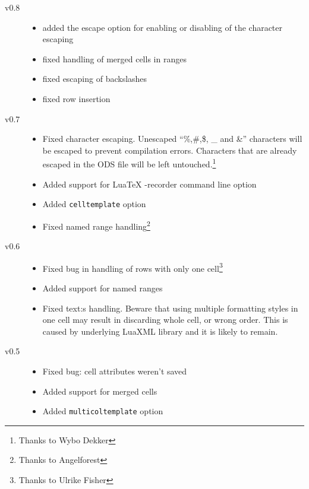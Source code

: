 \documentclass{ltxdoc}
\begin{document}
\begin{description}
  \item[v0.8]
    \begin{itemize}
      \item added the escape option for enabling or disabling of the character escaping
      \item fixed handling of merged cells in ranges
      \item fixed escaping of backslashes
      \item fixed row insertion
    \end{itemize}
   \item[v0.7]
     \begin{itemize}
       \item Fixed character escaping. Unescaped ``\%,\#,\$, \_ and \&'' characters will be escaped to prevent compilation errors.
        Characters that are already escaped in the ODS file will be left untouched.\footnote{Thanks to Wybo Dekker} 
         \item Added support for LuaTeX -recorder command line option
       \item Added \texttt{celltemplate} option
       \item Fixed named range handling\footnote{Thanks to Angelforest}
     \end{itemize}

\item[v0.6]
  \begin{itemize}
    \item  Fixed bug in handling of rows with only one cell\footnote{Thanks to Ulrike Fisher}
    \item  Added support for named ranges
    \item  Fixed text:s handling. Beware that using multiple formatting styles
      in one cell may result in discarding whole cell, or wrong order. This is
      caused by underlying LuaXML library and it is likely to remain.
\end{itemize}
\item[v0.5]
\begin{itemize}
  \item Fixed bug: cell attributes weren't saved
  \item Added support for merged cells
  \item Added \texttt{multicoltemplate} option
\end{itemize}


\end{description}
\end{document}
